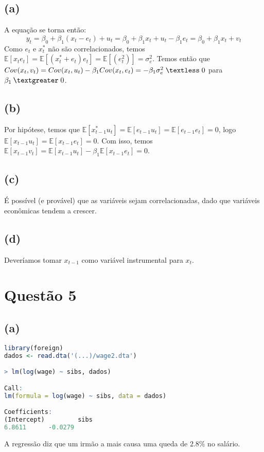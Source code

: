\documentclass[12pt]{article}
\begin{document}
\subsection*{(a)}
A equação se torna então:
\begin{equation*}
y_{t}=\beta_{0}+\beta_{1}(x_{t}-e_{t})+u_{t}=\beta_{0}+\beta_{1}x_{t}+u_{t}-\beta_{1}e_{t}=\beta_{0}+\beta_{1}x_{t}+v_{t}
\end{equation*}
Como $e_{t}$ e $x_{t}^*$ não são correlacionados, temos $\mathbb{E}[x_{t}e_{t}]=\mathbb{E}[(x_{t}^*+e_{t})e_{t}]=\mathbb{E}[(e_{t}^2)]=\sigma_{e}^2$. Temos então que $Cov(x_{t},v_{t})=Cov(x_{t},u_{t})-\beta_{1}Cov(x_{t},e_{t})=-\beta_{1}\sigma_{e}^2\;\textless \;0$ para $\beta_{1}\:\textgreater \;0$.

\subsection*{(b)}
Por hipótese, temos que $\mathbb{E}[x_{t-1}^*u_{t}]=\mathbb{E}[e_{t-1}u_{t}]=\mathbb{E}[e_{t-1}e_{t}]=0$, logo $\mathbb{E}[x_{t-1}u_{t}]=\mathbb{E}[x_{t-1}e_{t}]=0$. Com isso, temos $\mathbb{E}[x_{t-1}v_{t}]=\mathbb{E}[x_{t-1}u_{t}]-\beta_{1}\mathbb{E}[x_{t-1}e_{t}]=0$.

\subsection*{(c)}
É possível (e provável) que as variáveis sejam correlacionadas, dado que variáveis econômicas tendem a crescer. 

\subsection*{(d)}
Deveríamos tomar $x_{t-1}$ como variável instrumental para $x_{t}$.

\section*{Questão 5}

\subsection*{(a)}
\begin{lstlisting}[language=R]
library(foreign)
dados <- read.dta('(...)/wage2.dta')

> lm(log(wage) ~ sibs, dados)

Call:
lm(formula = log(wage) ~ sibs, data = dados)

Coefficients:
(Intercept)         sibs  
6.8611      -0.0279  
\end{lstlisting}
A regressão diz que um irmão a mais causa uma queda de $2.8\%$ no salário.
\end{document}

